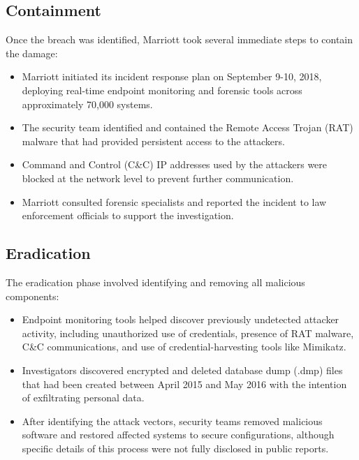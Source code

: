\documentclass[11pt]{book}
\begin{document}
\subsection{Containment}
Once the breach was identified, Marriott took several immediate steps to contain the damage:
\begin{itemize}
    \item Marriott initiated its incident response plan on September 9-10, 2018, deploying real-time endpoint monitoring and forensic tools across approximately 70,000 systems.
    \item The security team identified and contained the Remote Access Trojan (RAT) malware that had provided persistent access to the attackers.
    \item Command and Control (C\&C) IP addresses used by the attackers were blocked at the network level to prevent further communication.
    \item Marriott consulted forensic specialists and reported the incident to law enforcement officials to support the investigation.
\end{itemize}

\subsection{Eradication}
The eradication phase involved identifying and removing all malicious components:
\begin{itemize}
    \item Endpoint monitoring tools helped discover previously undetected attacker activity, including unauthorized use of credentials, presence of RAT malware, C\&C communications, and use of credential-harvesting tools like Mimikatz.
    \item Investigators discovered encrypted and deleted database dump (.dmp) files that had been created between April 2015 and May 2016 with the intention of exfiltrating personal data.
    \item After identifying the attack vectors, security teams removed malicious software and restored affected systems to secure configurations, although specific details of this process were not fully disclosed in public reports.
\end{itemize}
\end{document}
